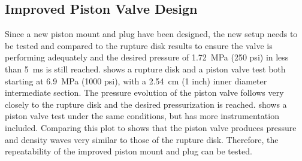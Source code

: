 \subsection{Improved Piston Valve Design}
Since a new piston mount and plug have been designed, the new setup needs to be tested and compared to the rupture disk results to ensure the valve is performing adequately and the desired pressure of \SI{1.72}{\mega\pascal} (250 psi) in less than \SI{5}{\milli\second} is still reached.  shows a rupture disk and a piston valve test both starting at \SI{6.9}{\mega\pascal} (1000 psi), with a \SI{2.54}{\centi\meter} (1 inch) inner diameter intermediate section. The pressure evolution of the piston valve follows very closely to the rupture disk and the desired pressurization is reached.  shows a piston valve test under the same conditions, but has more instrumentation included. Comparing this plot to  shows that the piston valve produces pressure and density waves very similar to those of the rupture disk. Therefore, the repeatability of the improved piston mount and plug can be tested. 

